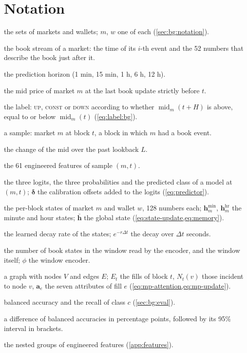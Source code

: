 \section*{Notation}
\begin{description}[nosep, font=\normalfont, leftmargin=3.2cm, style=sameline]
  \item[$\mathcal{M}$, $\mathcal{W}$] the sets of markets and wallets; $m$, $w$ one of each (\cref{sec:bg:notation}).
  \item[$(t_i, \mathbf{b}_i)$] the book stream of a market: the time of its $i$-th event and the 52 numbers that describe the book just after it.
  \item[$H$] the prediction horizon (1 min, 15 min, 1 h, 6 h, 12 h).
  \item[$\operatorname{mid}_m(t)$] the mid price of market $m$ at the last book update strictly before $t$.
  \item[$y_{m,t}$] the label: \textsc{up}, \textsc{const} or \textsc{down} according to whether $\operatorname{mid}_m(t + H)$ is above, equal to or below $\operatorname{mid}_m(t)$ (\cref{eq:label:bg}).
  \item[$(m, t)$] a sample: market $m$ at block $t$, a block in which $m$ had a book event.
  \item[$\Delta^{-}_{L}$] the change of the mid over the past lookback $L$.
  \item[$\mathbf{x}_{m,t}$] the 61 engineered features of sample $(m, t)$.
  \item[$\mathbf{z}_{m,t}$, $\hat{\mathbf{p}}_{m,t}$, $\hat{y}_{m,t}$] the three logits, the three probabilities and the predicted class of a model at $(m, t)$; $\boldsymbol{\delta}$ the calibration offsets added to the logits (\cref{eq:predictor}).
  \item[$\mathbf{h}_m$, $\mathbf{h}_w$] the per-block states of market $m$ and wallet $w$, 128 numbers each; $\mathbf{h}^{\min}_m$, $\mathbf{h}^{\mathrm{hr}}_m$ the minute and hour states; $\bar{\mathbf{h}}$ the global state (\cref{eq:state-update,eq:memory}).
  \item[$r$] the learned decay rate of the states; $e^{-r\Delta t}$ the decay over $\Delta t$ seconds.
  \item[$K$, $\mathbf{W}_{m,t}$] the number of book states in the window read by the encoder, and the window itself; $\phi$ the window encoder.
  \item[$G = (V, E)$] a graph with nodes $V$ and edges $E$; $E_t$ the fills of block $t$, $N_t(v)$ those incident to node $v$, $\mathbf{a}_e$ the seven attributes of fill $e$ (\cref{eq:mp-attention,eq:mp-update}).
  \item[$\mathrm{BA}$, $\mathrm{recall}_c$] balanced accuracy and the recall of class $c$ (\cref{sec:bg:eval}).
  \item[$\Delta$] a difference of balanced accuracies in percentage points, followed by its 95\% interval in brackets.
  \item[G1 \ldots G5] the nested groups of engineered features (\cref{app:features}).
\end{description}
